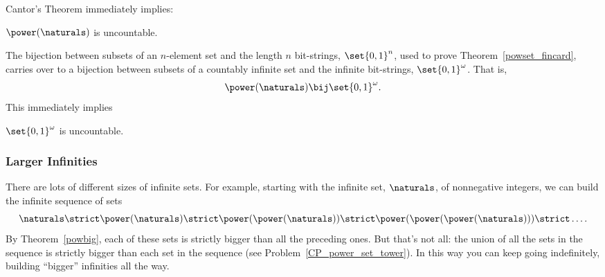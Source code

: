 Cantor's Theorem immediately implies:

\begin{corollary}
$\power(\naturals)$ is uncountable.
\end{corollary}

The bijection between subsets of an $n$-element set and the length $n$
bit-strings, $\set{0,1}^n$, used to prove
Theorem~\ref{powset_fincard}, carries over to a bijection between
subsets of a countably infinite set and the infinite bit-strings,
$\set{0,1}^{\omega}$.  That is,
\[
\power(\naturals) \bij \set{0,1}^{\omega}.
\]
This immediately implies
\begin{corollary}
$\set{0,1}^{\omega}$ is uncountable.
\end{corollary}

\subsubsection{Larger Infinities}

There are lots of different sizes of infinite sets.  For example,
starting with the infinite set, $\naturals$, of nonnegative integers,
we can build the infinite sequence of sets
\[
\naturals \strict \power(\naturals) \strict \power(\power(\naturals))
\strict \power(\power(\power(\naturals))) \strict \dots.
\]
By Theorem~\ref{powbig}, each of these sets is strictly bigger than
all the preceding ones.  But that's not all: the union of all the sets
in the sequence is strictly bigger than each set in the sequence (see
Problem~\ref{CP_power_set_tower}).  In this way you can keep going
indefinitely, building ``bigger'' infinities all the way.


\begin{problems}
\practiceproblems

\classproblems
{}

\homeworkproblems
{}

\examproblems
{}

\end{problems}

